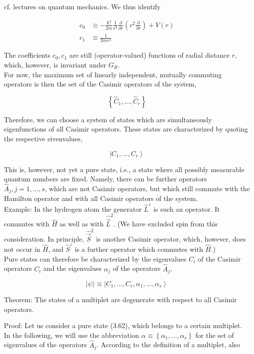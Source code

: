 \documentclass[10pt, letterpaper]{article}
\begin{document}
cf. lectures on quantum mechanics. We thus identify

$$
\begin{aligned}
c_{0} & \equiv-\frac{\hbar^{2}}{2 m} \frac{1}{r^{2}} \frac{\partial}{\partial r}\left(r^{2} \frac{\partial}{\partial r}\right)+V(r) \\
c_{1} & \equiv \frac{1}{2 m r^{2}}
\end{aligned}
$$

The coefficients $c_{0}, c_{1}$ are still (operator-valued) functions of radial distance $r$, which, however, is invariant under $G_{R}$.\\
For now, the maximum set of linearly independent, mutually commuting operators is then the set of the Casimir operators of the system,

$$
\left\{\hat{C}_{1}, \ldots, \hat{C}_{r}\right\}
$$

Therefore, we can choose a system of states which are simultaneously eigenfunctions of all Casimir operators. These states are characterized by quoting the respective eivenvalues,

$$
\left|C_{1}, \ldots, C_{r}\right\rangle
$$

This is, however, not yet a pure state, i.e., a state where all possibly measurable quantum numbers are fixed. Namely, there can be further operators $\hat{A}_{j}, j=1, \ldots, s$, which are not Casimir operators, but which still commute with the Hamilton operator and with all Casimir operators of the system.\\
Example: In the hydrogen atom the generator $\hat{L}^{z}$ is such an operator. It commutes with $\hat{H}$ as well as with $\hat{\vec{L}}^{2}$. (We have excluded spin from this consideration. In principle, $\hat{\vec{S}}^{2}$ is another Casimir operator, which, however, does not occur in $\hat{H}$, and $\hat{S}^{z}$ is a further operator which commutes with $\hat{H}$.)\\
Pure states can therefore be characterized by the eigenvalues $C_{i}$ of the Casimir operators $\hat{C}_{i}$ and the eigenvalues $\alpha_{j}$ of the operators $\hat{A}_{j}$,

$$
|\psi\rangle \equiv\left|C_{1}, \ldots, C_{r}, \alpha_{1}, \ldots, \alpha_{s}\right\rangle
$$

Theorem: The states of a multiplet are degenerate with respect to all Casimir operators.

Proof: Let us consider a pure state (3.62), which belongs to a certain multiplet. In the following, we will use the abbreviation $\alpha \equiv\left\{\alpha_{1}, \ldots, \alpha_{s}\right\}$ for the set of eigenvalues of the operators $\hat{A}_{j}$. According to the definition of a multiplet, also
\end{document}
